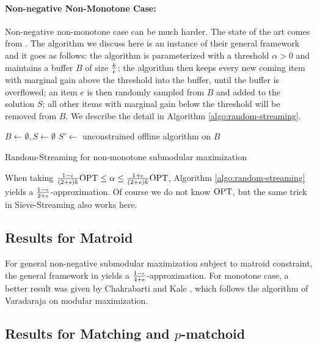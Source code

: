 \paragraph{Non-negative Non-Monotone Case:} Non-negative non-monotone case can be much harder. The state of the art comes from \cite{CGQ15}. The algorithm we discuss here is an instance of their general framework and it goes as follows: the algorithm is parameterized with a threshold $\alpha > 0$ and  maintains a buffer $B$ of size $\frac{k}{\epsilon}$; the algorithm then keeps every new coming item with marginal gain above the threshold into the buffer, until the buffer is overflowed; an item $e$ is then randomly sampled from $B$ and added to the solution $S$; all other items with marginal gain below the threshold will be removed from $B$.   We describe the detail in Algorithm \ref{algo:random-streaming}.

\begin{algorithm}[H]
\DontPrintSemicolon %
$B\gets \emptyset, S\gets \emptyset$\;
 {
}
$S' \gets$ unconstrained offline algorithm on $B$\;
\;
\caption{{\sc Random-Streaming} for non-monotone submodular maximization}
\label{algo:random-streaming}
\end{algorithm}

When taking $\frac{1 - \epsilon}{(2 + \epsilon)k}\text{OPT}\leq \alpha \leq \frac{1 + \epsilon}{(2 + e)k}\text{OPT}$, Algorithm \ref{algo:random-streaming} yields a $\frac{1 - \epsilon}{2 + \epsilon}$-approximation. Of course we do not know $\text{OPT}$, but the same trick in {\sc Sieve-Streaming} also works here.



\subsection{Results for Matroid}
For general non-negative submodular maximization subject to matroid constraint, the general framework in \cite{CGQ15} yields a $\frac{1 - \epsilon}{4 + \epsilon}$-approximation. For monotone case, a better result was given by Chakrabarti and Kale \cite{CK14}, which follows the algorithm of Varadaraja \cite{V11} on modular maximization. 








\subsection{Results for Matching and $p$-matchoid}
